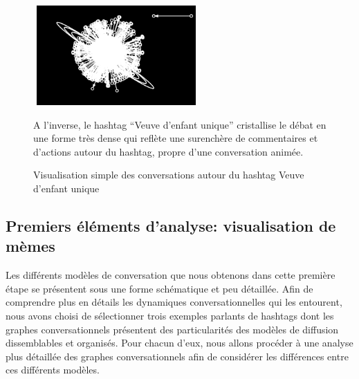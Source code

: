 \begin{figure}[ht]
    \begin{minipage}[b]{0.4\linewidth}
        \centering
        \includegraphics[width=2.5in,height=1.5in]{figures/chap3/chapitre3-img12.png}
        \par\vspace{0pt}
    \end{minipage}
    \begin{minipage}[b]{0.55\linewidth}
        \centering
        \raggedright
        A l{\textquoteright}inverse, le hashtag {\textquotedblleft}Veuve
        d{\textquoteright}enfant
        unique{\textquotedblright}  cristallise
        le d\'ebat en une forme tr\`es dense qui refl\`ete une surench\`ere de
        commentaires et d{\textquoteright}actions autour du hashtag, propre
        d{\textquoteright}une conversation anim\'ee. 
        \par\vspace{0pt}
    \end{minipage}

    \caption[Visualisation simple des conversations autour du hashtag Veuve d{\textquoteright}enfant unique]{Visualisation simple des conversations autour du hashtag Veuve d{\textquoteright}enfant unique}
\end{figure}


\subsection[Premiers \'el\'ements d{\textquoteright}analyse: visualisation de m\`emes ]{Premiers \'el\'ements d{\textquoteright}analyse: visualisation de m\`emes }
Les diff\'erents mod\`eles de conversation que nous obtenons dans cette
premi\`ere \'etape se pr\'esentent sous une forme sch\'ematique et peu
d\'etaill\'ee. Afin de comprendre plus en d\'etails les dynamiques
conversationnelles qui les entourent, nous avons choisi de
s\'electionner trois exemples parlants de hashtags dont les graphes
conversationnels pr\'esentent des particularit\'es des mod\`eles de
diffusion dissemblables et organis\'es. Pour chacun
d{\textquoteright}eux, nous allons proc\'eder \`a une analyse plus
d\'etaill\'ee des graphes conversationnels afin de consid\'erer les
diff\'erences entre ces diff\'erents mod\`eles.



